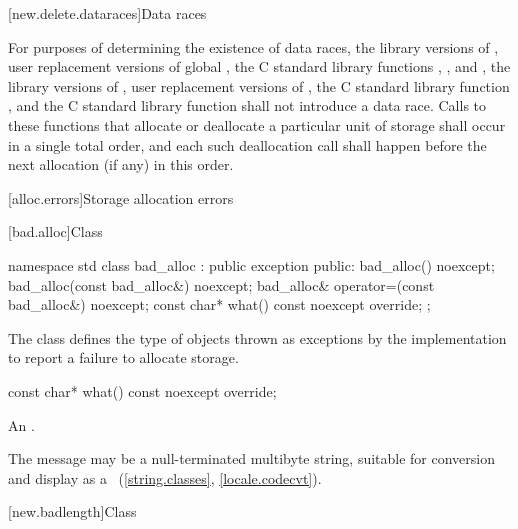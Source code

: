 [new.delete.dataraces]{Data races}

\pnum
For purposes of determining the existence of data races, the library versions
of , user replacement versions of global ,
the C standard library functions
, , and ,
the library
versions of , user replacement
versions of , the C standard library function
, and the C standard library function  shall not
introduce a data race.
Calls to these functions that allocate or deallocate a particular unit
of storage shall occur in a single total order, and each such deallocation call
shall happen before the next allocation (if any) in
this order.

[alloc.errors]{Storage allocation errors}

%
[bad.alloc]{Class }

%
\begin{codeblock}
namespace std {
  class bad_alloc : public exception {
  public:
    bad_alloc() noexcept;
    bad_alloc(const bad_alloc&) noexcept;
    bad_alloc& operator=(const bad_alloc&) noexcept;
    const char* what() const noexcept override;
  };
}
\end{codeblock}

\pnum
The class
defines the type of objects thrown as
exceptions by the implementation to report a failure to allocate storage.

%
\begin{itemdecl}
const char* what() const noexcept override;
\end{itemdecl}

\begin{itemdescr}
\pnum
\returns
An  \ntbs{}.

\pnum
\remarks
The message may be a null-terminated multibyte string,
suitable for conversion and display as a
~(\ref{string.classes}, \ref{locale.codecvt}).
\end{itemdescr}

%
%
[new.badlength]{Class }


